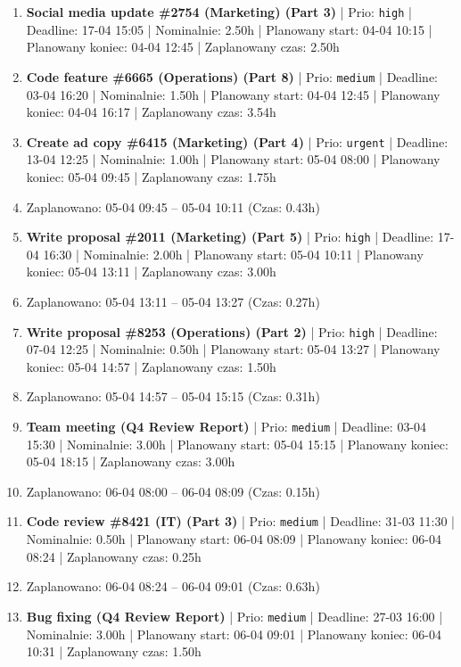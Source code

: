 {\begin{enumerate}
  \item [\textbf{14611}] \textbf{Social media update \#2754 (Marketing) (Part 3)} | Prio: \texttt{high} | Deadline: 17-04 15:05 | Nominalnie: 2.50h | Planowany start: 04-04 10:15 | Planowany koniec: 04-04 12:45 | Zaplanowany czas: 2.50h
  \item [\textbf{14667}] \textbf{Code feature \#6665 (Operations) (Part 8)} | Prio: \texttt{medium} | Deadline: 03-04 16:20 | Nominalnie: 1.50h | Planowany start: 04-04 12:45 | Planowany koniec: 04-04 16:17 | Zaplanowany czas: 3.54h
  \item [\textbf{14602}] \textbf{Create ad copy \#6415 (Marketing) (Part 4)} | Prio: \texttt{urgent} | Deadline: 13-04 12:25 | Nominalnie: 1.00h | Planowany start: 05-04 08:00 | Planowany koniec: 05-04 09:45 | Zaplanowany czas: 1.75h
  \item [\textbf{PRZERWA}] Zaplanowano: 05-04 09:45 -- 05-04 10:11 (Czas: 0.43h)
  \item [\textbf{14628}] \textbf{Write proposal \#2011 (Marketing) (Part 5)} | Prio: \texttt{high} | Deadline: 17-04 16:30 | Nominalnie: 2.00h | Planowany start: 05-04 10:11 | Planowany koniec: 05-04 13:11 | Zaplanowany czas: 3.00h
  \item [\textbf{PRZERWA}] Zaplanowano: 05-04 13:11 -- 05-04 13:27 (Czas: 0.27h)
  \item [\textbf{14614}] \textbf{Write proposal \#8253 (Operations) (Part 2)} | Prio: \texttt{high} | Deadline: 07-04 12:25 | Nominalnie: 0.50h | Planowany start: 05-04 13:27 | Planowany koniec: 05-04 14:57 | Zaplanowany czas: 1.50h
  \item [\textbf{PRZERWA}] Zaplanowano: 05-04 14:57 -- 05-04 15:15 (Czas: 0.31h)
  \item [\textbf{14635}] \textbf{Team meeting (Q4 Review Report)} | Prio: \texttt{medium} | Deadline: 03-04 15:30 | Nominalnie: 3.00h | Planowany start: 05-04 15:15 | Planowany koniec: 05-04 18:15 | Zaplanowany czas: 3.00h
  \item [\textbf{PRZERWA}] Zaplanowano: 06-04 08:00 -- 06-04 08:09 (Czas: 0.15h)
  \item [\textbf{14665}] \textbf{Code review \#8421 (IT) (Part 3)} | Prio: \texttt{medium} | Deadline: 31-03 11:30 | Nominalnie: 0.50h | Planowany start: 06-04 08:09 | Planowany koniec: 06-04 08:24 | Zaplanowany czas: 0.25h
  \item [\textbf{PRZERWA}] Zaplanowano: 06-04 08:24 -- 06-04 09:01 (Czas: 0.63h)
  \item [\textbf{14647}] \textbf{Bug fixing (Q4 Review Report)} | Prio: \texttt{medium} | Deadline: 27-03 16:00 | Nominalnie: 3.00h | Planowany start: 06-04 09:01 | Planowany koniec: 06-04 10:31 | Zaplanowany czas: 1.50h

\end{enumerate}}
